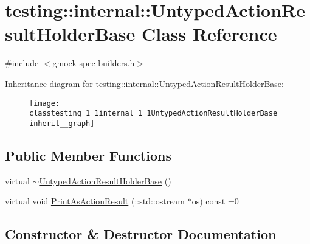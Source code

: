 \hypertarget{classtesting_1_1internal_1_1UntypedActionResultHolderBase}{}\section{testing\+:\+:internal\+:\+:Untyped\+Action\+Result\+Holder\+Base Class Reference}
\label{classtesting_1_1internal_1_1UntypedActionResultHolderBase}


{\ttfamily \#include $<$gmock-\/spec-\/builders.\+h$>$}



Inheritance diagram for testing\+:\+:internal\+:\+:Untyped\+Action\+Result\+Holder\+Base\+:
\nopagebreak
\begin{figure}[H]
\begin{center}
\leavevmode
\texttt{[image: classtesting\_1\_1internal\_1\_1UntypedActionResultHolderBase\_\_inherit\_\_graph]}
\end{center}
\end{figure}
\subsection*{Public Member Functions}
\begin{DoxyCompactItemize}
\item 
virtual \hyperlink{classtesting_1_1internal_1_1UntypedActionResultHolderBase_a2e6c331d249aea75ccc1e4fba3897a29}{$\sim$\+Untyped\+Action\+Result\+Holder\+Base} ()
\item 
virtual void \hyperlink{classtesting_1_1internal_1_1UntypedActionResultHolderBase_a4b4a558fcb1d3b02c0fec34f186d3b90}{Print\+As\+Action\+Result} (\+::std\+::ostream $\ast$os) const =0
\end{DoxyCompactItemize}


\subsection{Constructor \& Destructor Documentation}
